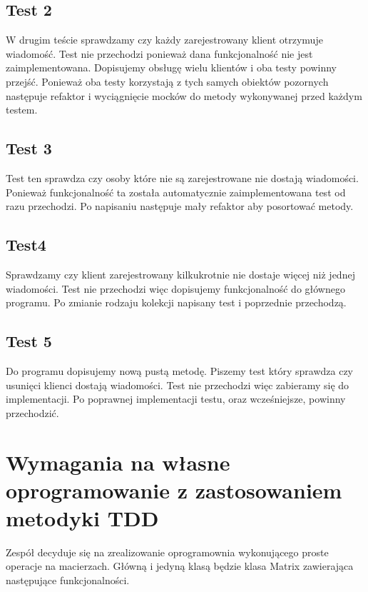 \documentclass[a4paper,12pt,twoside]{article}
\begin{document}
\subsection{Test 2}

W drugim teście sprawdzamy czy każdy zarejestrowany klient otrzymuje wiadomość.
Test nie przechodzi ponieważ dana funkcjonalność nie jest zaimplementowana.
Dopisujemy obsługę wielu klientów i oba testy powinny przejść.
Ponieważ oba testy korzystają z tych samych obiektów pozornych następuje refaktor i wyciągnięcie
mocków do metody wykonywanej przed każdym testem.

\subsection{Test 3}

Test ten sprawdza czy osoby które nie są zarejestrowane nie dostają wiadomości.
Ponieważ funkcjonalność ta została automatycznie zaimplementowana test od razu przechodzi.
Po napisaniu następuje mały refaktor aby posortować metody.

\subsection{Test4}

Sprawdzamy czy klient zarejestrowany kilkukrotnie nie dostaje więcej niż jednej wiadomości.
Test nie przechodzi więc dopisujemy funkcjonalność do głównego programu.
Po zmianie rodzaju kolekcji napisany test i poprzednie przechodzą.

\subsection{Test 5}
Do programu dopisujemy nową pustą metodę. Piszemy test który sprawdza czy usunięci klienci dostają wiadomości.
Test nie przechodzi więc zabieramy się do implementacji. Po poprawnej implementacji testu, oraz wcześniejsze, powinny przechodzić.


\section{Wymagania na własne oprogramowanie z zastosowaniem metodyki TDD}
\bigskip


Zespół decyduje się na zrealizowanie oprogramownia wykonującego proste operacje na macierzach.
Główną i jedyną klasą będzie klasa Matrix zawierająca następujące funkcjonalności.
\end{document}
